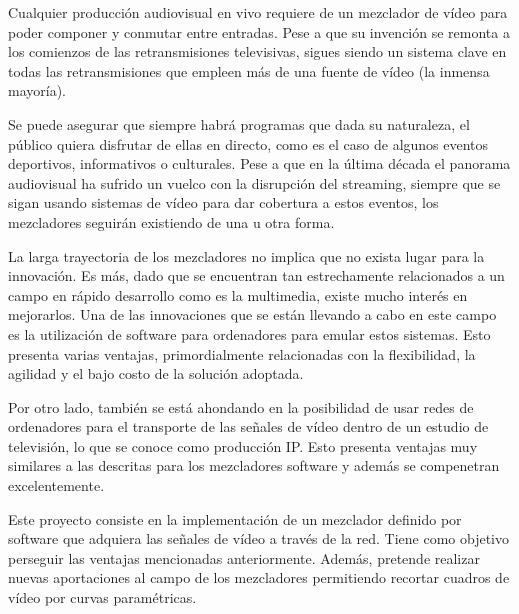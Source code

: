 \documentclass[../main.tex]{subfiles}
\begin{document}
Cualquier producción audiovisual en vivo requiere de un mezclador de vídeo para poder componer y conmutar entre entradas. Pese a que su invención se remonta a los comienzos de las retransmisiones televisivas, sigues siendo un sistema clave en todas las retransmisiones que empleen más de una fuente de vídeo (la inmensa mayoría).\newline

Se puede asegurar que siempre habrá programas que dada su naturaleza, el público quiera disfrutar de ellas en directo, como es el caso de algunos eventos deportivos, informativos o culturales. Pese a que en la última década el panorama audiovisual ha sufrido un vuelco con la disrupción del streaming, siempre que se sigan usando sistemas de vídeo para dar cobertura a estos eventos, los mezcladores seguirán existiendo de una u otra forma.\newline

La larga trayectoria de los mezcladores no implica que no exista lugar para la innovación. Es más, dado que se encuentran tan estrechamente relacionados a un campo en rápido desarrollo como es la multimedia, existe mucho interés en mejorarlos. Una de las innovaciones que se están llevando a cabo en este campo es la utilización de software para ordenadores para emular estos sistemas. Esto presenta varias ventajas, primordialmente relacionadas con la flexibilidad, la agilidad y el bajo costo de la solución adoptada.\newline  

Por otro lado, también se está ahondando en la posibilidad de usar redes de ordenadores para el transporte de las señales de vídeo dentro de un estudio de televisión, lo que se conoce como producción IP. Esto presenta ventajas muy similares a las descritas para los mezcladores software y además se compenetran excelentemente.\newline

Este proyecto consiste en la implementación de un mezclador definido por software que adquiera las señales de vídeo a través de la red. Tiene como objetivo perseguir las ventajas mencionadas anteriormente. Además, pretende realizar nuevas aportaciones al campo de los mezcladores permitiendo recortar cuadros de vídeo por curvas paramétricas.\newline
\end{document}
